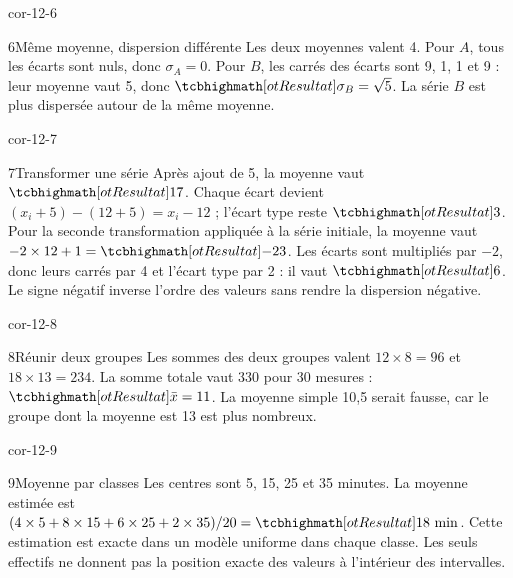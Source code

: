 \begin{blocLivre}{cor-12-6}
\begin{corrige}{6}{Même moyenne, dispersion différente}
Les deux moyennes valent 4. Pour $A$, tous les écarts sont nuls, donc $\sigma_A=0$. Pour $B$, les carrés des écarts sont 9, 1, 1 et 9 : leur moyenne vaut 5, donc $\res{\sigma_B=\sqrt5}$. La série $B$ est plus dispersée autour de la même moyenne.
\label{fig-cor-12-6}
\end{corrige}
\end{blocLivre}
\begin{blocLivre}{cor-12-7}
\begin{corrige}{7}{Transformer une série}
Après ajout de 5, la moyenne vaut $\res{17}$. Chaque écart devient $(x_i+5)-(12+5)=x_i-12$ ; l’écart type reste $\res3$. Pour la seconde transformation appliquée à la série initiale, la moyenne vaut $-2\times12+1=\res{-23}$. Les écarts sont multipliés par $-2$, donc leurs carrés par 4 et l’écart type par 2 : il vaut $\res6$. Le signe négatif inverse l’ordre des valeurs sans rendre la dispersion négative.
\end{corrige}
\end{blocLivre}
\begin{blocLivre}{cor-12-8}
\begin{corrige}{8}{Réunir deux groupes}
Les sommes des deux groupes valent $12\times8=96$ et $18\times13=234$. La somme totale vaut 330 pour 30 mesures : $\res{\bar x=11}$. La moyenne simple 10,5 serait fausse, car le groupe dont la moyenne est 13 est plus nombreux.
\end{corrige}
\end{blocLivre}
\begin{blocLivre}{cor-12-9}
\begin{corrige}{9}{Moyenne par classes}
Les centres sont 5, 15, 25 et 35 minutes. La moyenne estimée est $(4\times5+8\times15+6\times25+2\times35)/20=\res{18\text{ min}}$. Cette estimation est exacte dans un modèle uniforme dans chaque classe. Les seuls effectifs ne donnent pas la position exacte des valeurs à l’intérieur des intervalles.
\label{fig-cor-12-9}
\end{corrige}
\end{blocLivre}

